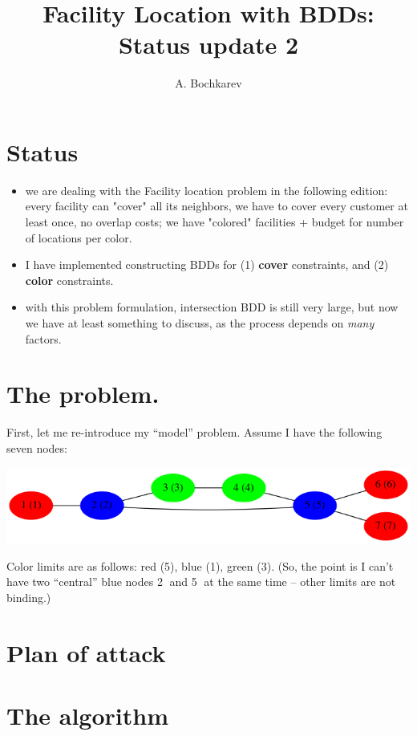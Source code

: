\documentclass[11pt]{article}
\author{A. Bochkarev}
\date{}
\title{Facility Location with BDDs: Status update 2}
\begin{document}
\maketitle

\section{Status}
\label{sec:org36e25f4}
\begin{itemize}
\item we are dealing with the Facility location problem in the following edition: every facility can
"cover" all its neighbors, we have to cover every customer at least once, no
overlap costs; we have "colored" facilities + budget for number of locations
per color.
\item I have implemented constructing BDDs for (1) \textbf{cover} constraints, and (2) \textbf{color} constraints.
\item with this problem formulation, intersection BDD is still very large, but now
we have at least something to discuss, as the process depends on \emph{many} factors.
\end{itemize}

\section{The problem.}
\label{sec:org62955c5}
First, let me re-introduce my ``model'' problem. Assume I have the following seven nodes:
\begin{center}
\includegraphics[width=.9\linewidth]{problem_LR.png}
\end{center}

Color limits are as follows: red (5), blue (1), green (3). (So, the point is I
can't have two ``central'' blue nodes \textcircled{2} and \textcircled{5} at the
same time -- other limits are not binding.)

\section{Plan of attack}
\label{sec:org7eb4fef}

\section{The algorithm}
\label{sec:org694daf3}
\end{document}
